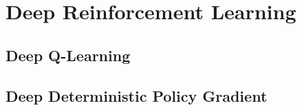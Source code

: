 \section{Deep Reinforcement Learning}\label{drl}

\subsection{Deep Q-Learning}

\subsection{Deep Deterministic Policy Gradient}
